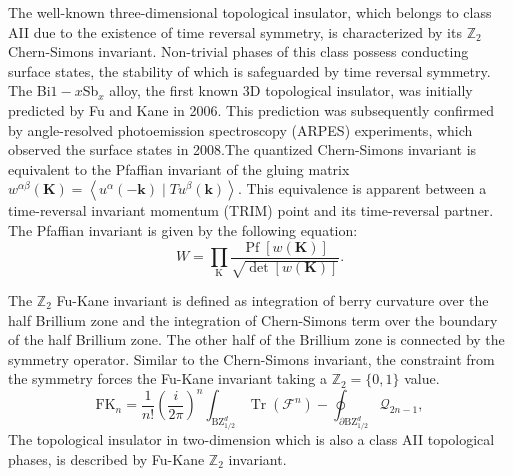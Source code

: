 The well-known three-dimensional topological insulator, which belongs to class AII due to the existence of time reversal symmetry, is characterized by its $\mathbb{Z}_2$ Chern-Simons invariant. Non-trivial phases of this class possess conducting surface states, the stability of which is safeguarded by time reversal symmetry. The Bi${1-x}$Sb$_x$ alloy, the first known 3D topological insulator, was initially predicted by Fu and Kane in 2006\cite{fu2007topological}. This prediction was subsequently confirmed by angle-resolved photoemission spectroscopy (ARPES) experiments, which observed the surface states in 2008\cite{hsieh2008topological}.The quantized Chern-Simons invariant is equivalent to the Pfaffian invariant of the gluing matrix $w^{\alpha\beta}(\mathbf{K}) = \left\langle u^\alpha(-\mathbf{k}) \mid T u^\beta(\mathbf{k})\right\rangle$. This equivalence is apparent between a time-reversal invariant momentum (TRIM) point and its time-reversal partner\cite{fu2007topological, wang2010equivalent, ando2013topological}. The Pfaffian invariant is given by the following equation:
\begin{equation}
W=\prod_{\mathrm{K}} \frac{\operatorname{Pf}[w(\mathbf{K})]}{\sqrt{\operatorname{det}[w(\mathbf{K})]}}.
\end{equation}


The $\mathbb{Z}_2$ Fu-Kane invariant is defined as integration of berry curvature over the half Brillium zone and the integration of Chern-Simons term over the boundary of the half Brillium zone. The other half of the Brillium zone is connected by the symmetry operator. Similar to the Chern-Simons invariant, the constraint from the symmetry forces the Fu-Kane invariant taking a $\mathbb{Z}_2 = \{0, 1\}$ value.
\begin{equation}
\mathrm{FK}_n=\frac{1}{n !}\left(\frac{i}{2 \pi}\right)^n \int_{\mathrm{BZ}_{1 / 2}^d} \operatorname{Tr}\left(\mathcal{F}^n\right)-\oint_{\partial \mathrm{BZ}_{1 / 2}^d} \mathcal{Q}_{2 n-1},
\end{equation}
The topological insulator in two-dimension which is also a class AII topological phases, is described by Fu-Kane $\mathbb{Z}_2$ invariant\cite{fu2006time}.



